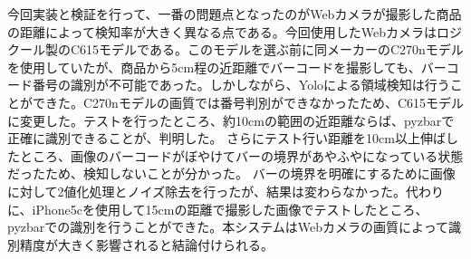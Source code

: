 今回実装と検証を行って、一番の問題点となったのがWebカメラが撮影した商品の距離によって検知率が大きく異なる点である。今回使用したWebカメラはロジクール製のC615モデルである。このモデルを選ぶ前に同メーカーのC270nモデルを使用していたが、商品から5cm程の近距離でバーコードを撮影しても、バーコード番号の識別が不可能であった。しかしながら、Yoloによる領域検知は行うことができた。C270nモデルの画質では番号判別ができなかったため、C615モデルに変更した。テストを行ったところ、約10cmの範囲の近距離ならば、pyzbarで正確に識別できることが、判明した。
さらにテスト行い距離を10cm以上伸ばしたところ、画像のバーコードがぼやけてバーの境界があやふやになっている状態だったため、検知しないことが分かった。
バーの境界を明確にするために画像に対して2値化処理とノイズ除去を行ったが、結果は変わらなかった。代わりに、iPhone5cを使用して15cmの距離で撮影した画像でテストしたところ、pyzbarでの識別を行うことができた。本システムはWebカメラの画質によって識別精度が大きく影響されると結論付けられる。